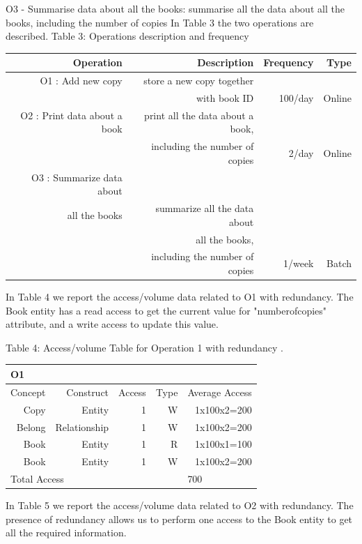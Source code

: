 O3 - Summarise data about all the books: summarise all the data about all the books, including the number of copies 
In Table 3 the two operations are described.
Table 3: Operations description and frequency 
\begin{center}
\begin{tabular}{|r|r|r|r|}
\hline

    Operation & Description & Frequency & Type\\\hline
   
O1 : Add new copy & store a new copy together \\ &with book ID  & 100/day & Online \\\hline
O2 : Print data about a book & print all the data about a book, \\ &including the number of copies  & 2/day  & Online \\\hline
O3 : Summarize data about \\ all the books & summarize all the data about\\ & all the books, \\&including the number of copies  &1/week   & Batch \\\hline

   
\end{tabular}
\end{center}



In Table  4 we report the access/volume data related to O1 with redundancy. The Book entity has a read access to get the current value for "numberofcopies" attribute, and a write access to update this value. 

Table 4: Access/volume Table for Operation 1 with redundancy .\\

\begin{center}
\begin{tabular}{|r|r|r|r|r|}
\hline
\multicolumn{5}{|l|}{O1}\\\hline
    Concept & Construct & Access & Type & Average 
    Access\\\hline
    {Copy} &  {Entity} &  {1}  & {W}  & {1x100x2=200 }\\\hline
      {Belong } &  {Relationship} &  {1}  & {W}  & {1x100x2=200 }\\\hline
    {Book } &  {Entity} &  {1}  & {R}  & {1x100x1=100 }\\\hline
     {Book } &  {Entity} &  {1}  & {W}  & {1x100x2=200 }\\\hline

    \multicolumn{4}{|l}{Total Access}&\multicolumn{1}{|l|}{700}\\\hline
\end{tabular}
\end{center}
In Table  5 we report the access/volume data related to O2 with redundancy. The presence of redundancy allows us to perform one access to the Book entity to get all the required information. 

